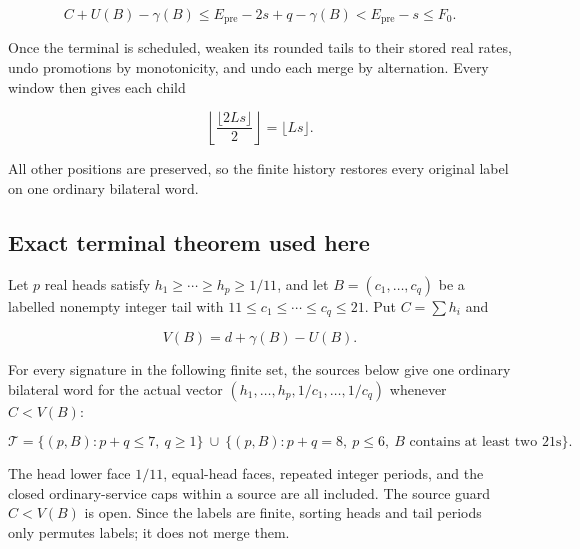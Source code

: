 \documentclass[11pt,a4paper]{article}
\begin{document}
\begin{equation}
C+U(B)-\gamma(B)
 \le E_{\mathrm{pre}}-2s+q-\gamma(B)
 < E_{\mathrm{pre}}-s\le F_0.
\tag{B.5}\label{eq:B.5}
\end{equation}

Once the terminal is scheduled, weaken its rounded tails to their stored real rates, undo promotions by monotonicity, and undo each merge by alternation. Every window then gives each child

\begin{equation}
\left\lfloor\frac{\lfloor2Ls\rfloor}{2}\right\rfloor
       =\lfloor Ls\rfloor.
\tag{B.6}\label{eq:B.6}
\end{equation}

All other positions are preserved, so the finite history restores every original label on one ordinary bilateral word.

\subsection{Exact terminal theorem used here}\label{sec:B.3}

Let \(p\) real heads satisfy \(h_1\ge\cdots\ge h_p\ge1/11\), and let \(B=(c_1,\ldots,c_q)\) be a labelled nonempty integer tail with \(11\le c_1\le\cdots\le c_q\le21\). Put \(C=\sum h_i\) and

\[
 V(B)=d+\gamma(B)-U(B).
\]

For every signature in the following finite set, the sources below give one ordinary bilateral word for the actual vector \((h_1,\ldots,h_p,1/c_1,\ldots,1/c_q)\) whenever \(C<V(B)\):

\begin{equation}
\mathcal T=\{(p,B):p+q\le7,\ q\ge1\}
 \ \cup\
 \{(p,B):p+q=8,\ p\le6,\ B\text{ contains at least two }21\text{s}\}.
\tag{B.7}\label{eq:B.7}
\end{equation}

The head lower face \(1/11\), equal-head faces, repeated integer periods, and the closed ordinary-service caps within a source are all included. The source guard \(C<V(B)\) is open. Since the labels are finite, sorting heads and tail periods only permutes labels; it does not merge them.

\begingroup\small
\end{document}
